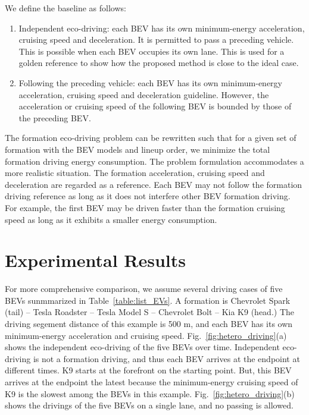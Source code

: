 \documentclass{IEEEtran}
\begin{document}
We define the baseline as follows:
\begin{enumerate}
\item Independent eco-driving: each BEV has its own minimum-energy acceleration, cruising speed and deceleration. 
It is permitted to pass a preceding vehicle. This is possible when each BEV occupies its own lane. This is used for a golden reference to show how the proposed method is close to the ideal case.
\item Following the preceding vehicle: each BEV has its own minimum-energy acceleration, cruising speed and deceleration guideline. However, the acceleration or cruising speed of the following BEV is bounded by those of the preceding BEV.
\end{enumerate}

The formation eco-driving problem can be rewritten such that for a given set of formation with the BEV models and lineup order, we minimize the total formation driving energy consumption.
The problem formulation accommodates a more realistic situation. The formation acceleration, cruising speed and deceleration are regarded as a reference. Each BEV may not follow the formation driving reference as long as it does not interfere other BEV formation driving. For example, the first BEV may be driven faster than the formation cruising speed as long as it exhibits a smaller energy consumption.

\section{Experimental Results}\label{sec:exp}



For more comprehensive comparison, we assume several driving cases of five BEVs sunmmarized in Table~\ref{table:list_EVs}. A formation is Chevrolet Spark (tail) -- Tesla Roadster -- Tesla Model S -- Chevrolet Bolt -- Kia K9 (head.)
The driving segement distance of this example is 500 m, and each BEV has its own minimum-energy acceleration and cruising speed. 
Fig.~\ref{fig:hetero_driving}(a) shows the independent eco-driving of the five BEVs over time. Independent eco-driving is not a formation driving, and thus each BEV arrives at the endpoint at different times.
K9 starts at the forefront on the starting point. But, this BEV arrives at the endpoint the latest because the minimum-energy cruising speed of K9 is the slowest among the BEVs in this example. 
Fig.~\ref{fig:hetero_driving}(b) shows the drivings of the five BEVs on a single lane, and no passing is allowed. 
\end{document}

